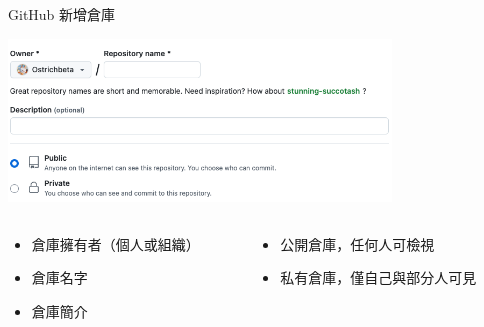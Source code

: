 \documentclass[xetex, unicode, 10pt, aspectratio=169]{beamer}
\begin{document}
\begin{frame}{GitHub 新增倉庫}
    \begin{center}
        \includegraphics[width=4in]{./img/github-create-repo-1.png}

        \begin{columns}
            \begin{column}{3in}
                \begin{itemize}
                    \item {}\quad 倉庫擁有者（個人或組織）
                    \item {}\quad 倉庫名字
                    \item {}\quad 倉庫簡介
                \end{itemize}
            \end{column}

            \begin{column}{3in}
                \begin{itemize}
                    \item {}\quad 公開倉庫，任何人可檢視
                    \item {}\quad 私有倉庫，僅自己與部分人可見
                \end{itemize}
            \end{column}
        \end{columns}
    \end{center}
\end{frame}
\end{document}
